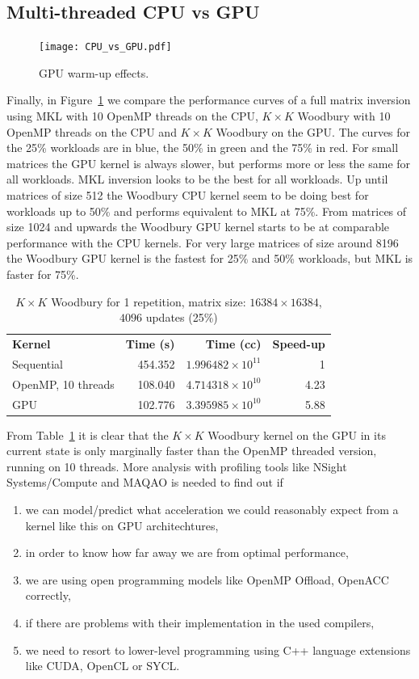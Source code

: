 \documentclass[11pt]{article}
\numberwithin{figure}{section}
\numberwithin{table}{section}
\begin{document}
    \subsection{Multi-threaded CPU vs GPU}
      \begin{figure}
        \centering
        \texttt{[image: CPU\_vs\_GPU.pdf]}
        \caption{GPU warm-up effects.}
        \label{fig:gpu-vs-cpu}
      \end{figure}
      Finally, in Figure~\ref{fig:gpu-vs-cpu} we compare the performance curves of a full matrix inversion using MKL with 10 OpenMP threads on the CPU, $K\times K$ Woodbury with 10 OpenMP threads on the CPU and $K\times K$ Woodbury on the GPU. The curves for the 25\% workloads are in blue, the 50\% in green and the 75\% in red. For small matrices the GPU kernel is always slower, but performs more or less the same for all workloads. MKL inversion looks to be the best for all workloads. Up until matrices of size 512 the Woodbury  CPU kernel seem to be doing best for workloads up to 50\% and performs equivalent to MKL at 75\%. From matrices of size 1024 and upwards the Woodbury GPU kernel starts to be at comparable performance with the CPU kernels. For very large matrices of size around 8196 the Woodbury GPU kernel is the fastest for 25\% and 50\% workloads, but MKL is faster for 75\%.
      \begin{table}[H]
        \centering
        \begin{tabular}{lrrr}
          \textbf{Kernel} & \textbf{Time (s)} & \textbf{Time (cc)} & \textbf{Speed-up}\\
            Sequential & 454.352 & $1.996482\times10^{11}$ & 1\\
            OpenMP, 10 threads & 108.040 & $4.714318\times10^{10}$ & 4.23\\
            GPU & 102.776 & $3.395985\times10^{10}$ & 5.88
        \end{tabular}
        \caption{$K\!\times\!K$ Woodbury for 1 repetition, matrix size: $16384\times16384$, $4096$ updates (25\%)}
        \label{tab:cpu-vs-gpu}
      \end{table}
      From Table~\ref{tab:cpu-vs-gpu} it is clear that the $K\!\times\!K$ Woodbury kernel on the GPU in its current state is only marginally faster than the OpenMP threaded version, running on 10 threads. More analysis with profiling tools like NSight Systems/Compute and MAQAO is needed to find out if
      \begin{enumerate}
        \item we can model/predict what acceleration we could reasonably expect from a kernel like this on GPU architechtures,
        \item in order to know how far away we are from optimal performance,
        \item we are using open programming models like OpenMP Offload, OpenACC correctly,
        \item if there are problems with their implementation in the used compilers,
        \item we need to resort to lower-level programming using C++ language extensions like CUDA, OpenCL or SYCL.
      \end{enumerate}
\end{document}
